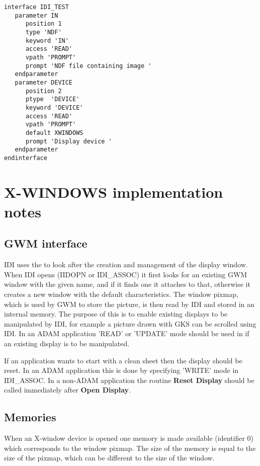 \newpage
\begin{small}
\begin{verbatim}
interface IDI_TEST
   parameter IN
      position 1
      type 'NDF'
      keyword 'IN'
      access 'READ'
      vpath 'PROMPT'
      prompt 'NDF file containing image '
   endparameter
   parameter DEVICE
      position 2
      ptype  'DEVICE'
      keyword 'DEVICE'
      access 'READ'
      vpath 'PROMPT'
      default XWINDOWS
      prompt 'Display device '
   endparameter
endinterface
\end{verbatim}
\end{small}

\newpage
\section{X-WINDOWS implementation notes}
\label{se:xin}

\subsection{GWM interface}

IDI uses the  to look after the creation
and management of the display window. When IDI opens (IIDOPN or IDI\_ASSOC)
it first looks for an existing GWM window with the given name, and if
it finds one it attaches to that, otherwise it creates a new window with
the default characteristics. The window pixmap, which is used by GWM to
store the picture, is then read by IDI and stored in an internal memory.
The purpose of this is to enable existing displays to be manipulated by
IDI, for example a picture drawn with GKS can be scrolled using IDI.
In an ADAM application 'READ' or 'UPDATE' mode should be used in
 if an existing display is to be manipulated.

If an application wants to start with a clean sheet then the display
should be reset. In an ADAM application this is done by specifying
'WRITE' mode in IDI\_ASSOC. In a non-ADAM application the routine
{\bf Reset Display} should be called immediately after {\bf Open
Display}.

\subsection{Memories}

When an X-window device is opened one memory is made available
(identifier 0) which corresponds to the window pixmap. The size of the
memory is equal to the size of the pixmap, which can be different to
the size of the window.

